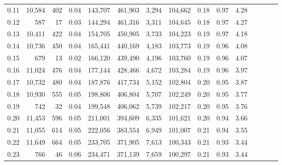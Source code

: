 \begin{tabular}{rrrcrrrrrrrrrrr}
0.11 &  10,584 &     402 &                                       0.04 &  143,707 &  461,903 &    3,294 &  104,662 &  0.18 &  0.97 &                         4.28 \\
0.12 &     587 &      17 &                                       0.03 &  144,294 &  461,316 &    3,311 &  104,645 &  0.18 &  0.97 &                         4.27 \\
0.13 &  10,411 &     422 &                                       0.04 &  154,705 &  450,905 &    3,733 &  104,223 &  0.19 &  0.97 &                         4.18 \\
0.14 &  10,736 &     450 &                                       0.04 &  165,441 &  440,169 &    4,183 &  103,773 &  0.19 &  0.96 &                         4.08 \\
0.15 &     679 &      13 &                                       0.02 &  166,120 &  439,490 &    4,196 &  103,760 &  0.19 &  0.96 &                         4.07 \\
0.16 &  11,024 &     476 &                                       0.04 &  177,144 &  428,466 &    4,672 &  103,284 &  0.19 &  0.96 &                         3.97 \\
0.17 &  10,732 &     480 &                                       0.04 &  187,876 &  417,734 &    5,152 &  102,804 &  0.20 &  0.95 &                         3.87 \\
0.18 &  10,930 &     555 &                                       0.05 &  198,806 &  406,804 &    5,707 &  102,249 &  0.20 &  0.95 &                         3.77 \\
0.19 &     742 &      32 &                                       0.04 &  199,548 &  406,062 &    5,739 &  102,217 &  0.20 &  0.95 &                         3.76 \\
0.20 &  11,453 &     596 &                                       0.05 &  211,001 &  394,609 &    6,335 &  101,621 &  0.20 &  0.94 &                         3.66 \\
0.21 &  11,055 &     614 &                                       0.05 &  222,056 &  383,554 &    6,949 &  101,007 &  0.21 &  0.94 &                         3.55 \\
0.22 &  11,649 &     664 &                                       0.05 &  233,705 &  371,905 &    7,613 &  100,343 &  0.21 &  0.93 &                         3.44 \\
0.23 &     766 &      46 &                                       0.06 &  234,471 &  371,139 &    7,659 &  100,297 &  0.21 &  0.93 &                         3.44 \\

\end{tabular}
